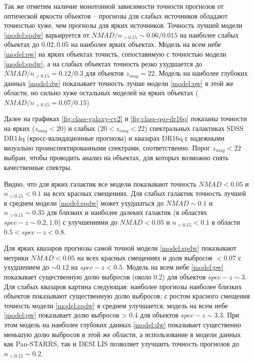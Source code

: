\documentclass[fleqn,usenatbib]{mnras}
\begin{document}
Так же отметим наличие монотонной зависимости точности прогнозов от оптической яркости объектов -- прогнозы для слабых источников обладают точностью хуже, чем прогнозы для ярких источников. Точность лучшей модели \ref{model:spdw} варьируется от $NMAD/n_{>0.15} \sim 0.06/0.015$ на наиболее слабых объектах до $0.02, 0.05$ на наиболее ярких объектах. Модель на всем небе \ref{model:pw} на ярких объектах точнсть, сопоставимую с точностью модели \ref{model:spdw}, а на слабых объектах точность резко ухудшается до $NMAD/n_{>0.15} = 0.12/0.3$ для объектов $z_{mag} = 22$. Модель на наиболее глубоких данных \ref{model:dw} показывает точность лучше модели \ref{model:pw} в этой же области, но сильно хуже остальных моделей на ярких объектах ($NMAD/n_{>0.15} = 0.07/0.15$)

Далее на графиках \ref{fig:class-galaxy-cv2} и \ref{fig:class-qso-dr16q} показаны точности на ярких ($z_{mag} < 20$) и слабых ($20 < z_{mag} < 22$) спектральных галактиках SDSS DR14q (кросс-валидационные прогнозы) и квазарах DR16q с надежными визуально проинспектированными спектрами, соответственно. Порог $z_{mag} < 22$ выбран, чтобы проводить анализ на объектах, для которых возможно снять качественные спектры.

Видно, что для ярких галактик все модели показывают точность $NMAD < 0.05$ и $n_{>0.15} < 0.1$ на всех красных смещениях. Для слабых галактик точность лучшей в среднем модели \ref{model:spdw} может ухудшаться до $NMAD \sim 0.1$ и $n_{>0.15} \sim 0.35$ для близких и наиболее далеких галактик (в областях $spec-z \sim 0.2, 1.0$) с улучшениями до $NMAD < 0.05$ и $n_{>0.15} < 0.1$ в области $0.5 < spec-z < 0.8$.

Для ярких квазаров прогнозы самой точной модели \ref{model:spdw} показывают метрики $NMAD < 0.05$ на всех красных смещениях и доля выбросов $< 0.07$ с ухудшением до $\sim 0.12$ на $spec-z < 0.5$. Модель на всем небе \ref{model:pw} показывает существенную долю выбросов (около 0.2) для объектов $spec-z \sim 3$. Для слабых квазаров картина следующая: наиболее прогнозы наиболее близких объектов показывают существенную долю выбросов; с ростом красного смещения точность модели \ref{model:spdw} в среднем улучшается; модель на всем небе \ref{model:pw} показывает долю выбросов > 0.4 для объектов $spec-z \sim 3.3$. При этом модель на наиболее глубоких данных \ref{model:dw} показывает существенно меньшую долю выбросов в этой же области, а использование в модели данных как Pan-STARRS, так и DESI LIS позволяет улучшить точность прогнозов до $n_{>0.15} \sim 0.2$.
\end{document}

